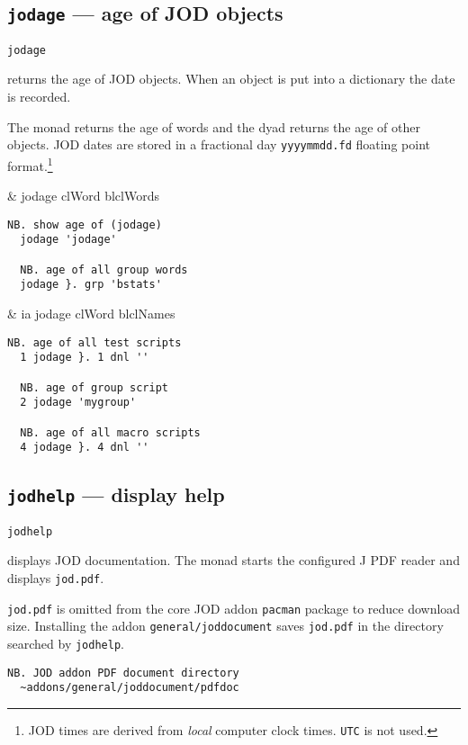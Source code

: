 \subsection{\texttt{jodage} --- age of JOD objects}  

\hypertarget{il:jodage}{\texttt{jodage}} returns the age of JOD objects.  When an object is 
put into a dictionary the date is recorded. 

The monad returns the age of words and the dyad returns the age of other objects.  
JOD dates are stored in a fractional day \verb|yyyymmdd.fd| floating point format.\footnote{JOD times
are derived from \emph{local} computer clock times. \texttt{UTC} is not used.
}    

\begin{wordhead}
\monad & jodage clWord \argsep blclWords \\
\end{wordhead}
\begin{lstlisting}[frame=single,framerule=0pt] 
  NB. show age of (jodage)  
  jodage 'jodage' 

  NB. age of all group words 
  jodage }. grp 'bstats' 
\end{lstlisting}

\begin{wordhead}
\dyad & ia jodage clWord \argsep blclNames \\
\end{wordhead}
\begin{lstlisting}[frame=single,framerule=0pt] 
  NB. age of all test scripts  
  1 jodage }. 1 dnl ''   

  NB. age of group script  
  2 jodage 'mygroup'     

  NB. age of all macro scripts  
  4 jodage }. 4 dnl ''   
\end{lstlisting}


\subsection{\texttt{jodhelp} --- display help}\label{ss:jodhelp}  

\hypertarget{il:jodhelp}{\texttt{jodhelp}} displays JOD documentation.  
The monad starts the configured J PDF reader and displays \verb|jod.pdf|. 

\verb|jod.pdf| is omitted from the core JOD addon \texttt{pacman} package to
reduce download size. Installing the addon \texttt{general/joddocument} 
saves \verb|jod.pdf| in the directory searched by \texttt{jodhelp}.
\begin{lstlisting}[frame=single,framerule=0pt]
  NB. JOD addon PDF document directory
  ~addons/general/joddocument/pdfdoc
\end{lstlisting}

